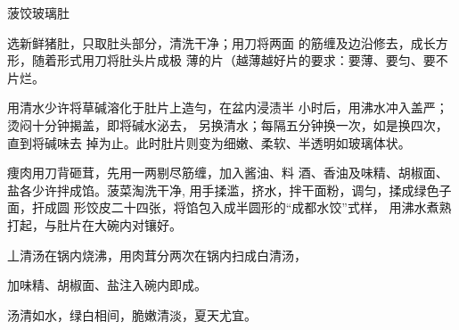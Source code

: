 \begin{recipe}{菠饺玻璃肚}

\ingredients


\cooking

\step 选新鲜猪肚，只取肚头部分，清洗干净；用刀将两面 的筋缠及边沿修去，成长方形，随着形式用刀将肚头片成极 薄的片（越薄越好片的要求：要薄、要匀、要不片烂。

\step 用清水少许将草碱溶化于肚片上造勻，在盆内浸渍半 小时后，用沸水冲入盖严；烫闷十分钟揭盖，即将碱水泌去， 另换清水；每隔五分钟换一次，如是换四次，直到将碱味去 掉为止。此时肚片则变为细嫩、柔软、半透明如玻璃体状。

\step 痩肉用刀背砸茸，先用一两剔尽筋缠，加入酱油、料 酒、香油及味精、胡椒面、盐各少许拌成馅。菠菜淘洗干净, 用手揉滥，挤水，拌干面粉，调匀，揉成绿色子面，扞成圆 形饺皮二十四张，将馅包入成半圆形的“成都水饺”式样， 用沸水煮熟打起，与肚片在大碗内对镶好。

丄清汤在锅内烧沸，用肉茸分两次在锅内扫成白清汤，

加味精、胡椒面、盐注入碗内即成。

\notes

汤清如水，绿白相间，脆嫩清淡，夏天尤宜。

\end{recipe}

